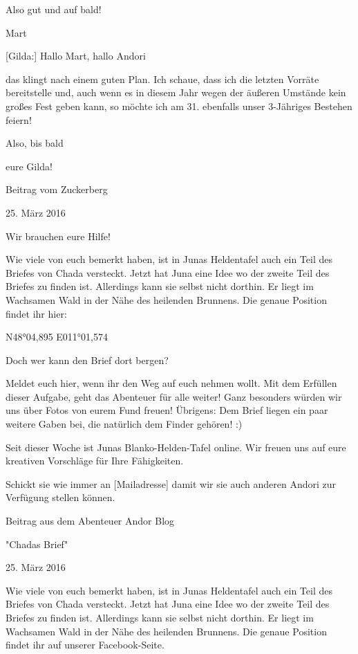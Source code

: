\documentclass[10pt, a4paper, oneside]{book}
\begin{document}
\begin{multicols}{2}
Also gut und auf bald!

Mart


[Gilda:] Hallo Mart, hallo Andori

das klingt nach einem guten Plan. Ich schaue, dass ich die letzten Vorräte bereitstelle und, auch wenn es in diesem Jahr wegen der äußeren Umstände kein großes Fest geben kann, so möchte ich am 31. ebenfalls unser 3-Jähriges Bestehen feiern!

Also, bis bald

eure Gilda!


\begin{center}
    Beitrag vom Zuckerberg

    25. März 2016
\end{center}

Wir brauchen eure Hilfe!

Wie viele von euch bemerkt haben, ist in Junas Heldentafel auch ein Teil des Briefes von Chada versteckt. Jetzt hat Juna eine Idee wo der zweite Teil des Briefes zu finden ist. Allerdings kann sie selbst nicht dorthin. Er liegt im Wachsamen Wald in der Nähe des heilenden Brunnens. Die genaue Position findet ihr hier:

N48°04,895 E011°01,574

Doch wer kann den Brief dort bergen?

Meldet euch hier, wenn ihr den Weg auf euch nehmen wollt. Mit dem Erfüllen dieser Aufgabe, geht das Abenteuer für alle weiter! Ganz besonders würden wir uns über Fotos von eurem Fund freuen! Übrigens: Dem Brief liegen ein paar weitere Gaben bei, die natürlich dem Finder gehören! :)

Seit dieser Woche ist Junas Blanko-Helden-Tafel online. Wir freuen uns auf eure kreativen Vorschläge für Ihre Fähigkeiten.

Schickt sie wie immer an [Mailadresse] damit wir sie auch anderen Andori zur Verfügung stellen können.


\begin{center}
    Beitrag aus dem Abenteuer Andor Blog

    "Chadas Brief"

    25. März 2016
\end{center}


Wie viele von euch bemerkt haben, ist in Junas Heldentafel auch ein Teil des Briefes von Chada versteckt. Jetzt hat Juna eine Idee wo der zweite Teil des Briefes zu finden ist. Allerdings kann sie selbst nicht dorthin. Er liegt im Wachsamen Wald in der Nähe des heilenden Brunnens. Die genaue Position findet ihr auf unserer Facebook-Seite.


\end{multicols}
\end{document}
